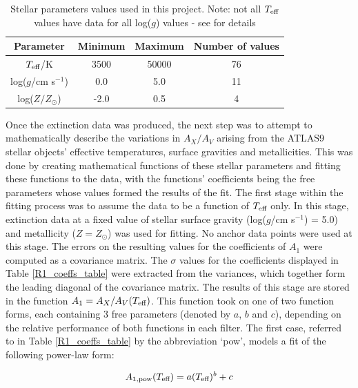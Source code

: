 \documentclass[12pt, a4paper]{report}
\begin{document}
\begin{table}
\begin{center}
\begin{tabular}{cccc}
\hline
Parameter & Minimum & Maximum & Number of values\\
\hline
$T_{\textnormal{eff}}$/K & 3500 & 50000 & 76 \\
log($g$/cm s$^{-1}$) & 0.0 & 5.0 & 11 \\
log($Z/Z_{\odot}$) & -2.0 & 0.5 & 4 \\
\hline

\end{tabular}
\caption{Stellar parameters values used in this project. Note: not all $T_{\textnormal{eff}}$ values have data for all log($g$) values - see \cite{2004astro.ph..5087C} for details}
\label{param_range_table}
\end{center}
\end{table}
Once the extinction data was produced, the next step was to attempt to mathematically describe the variations in $A_{X}/A_{V}$ arising from the ATLAS9 stellar objects' effective temperatures, surface gravities and metallicities. This was done by creating mathematical functions of these stellar parameters and fitting these functions to the data, with the functions' coefficients being the free parameters whose values formed the results of the fit.
The first stage within the fitting process was to assume the data to be a function of $T_{\textnormal{eff}}$ only. In this stage, extinction data at a fixed value of stellar surface gravity (log($g$/cm s$^{-1}$) = 5.0) and metallicity ($Z = Z_{\odot}$) was used for fitting. No anchor data points were used at this stage. The errors on the resulting values for the coefficients of $A_{1}$ were computed as a covariance matrix. The $\sigma$ values for the coefficients displayed in Table \ref{R1_coeffs_table} were extracted from the variances, which together form the leading diagonal of the covariance matrix. The results of this stage are stored in the function $A_{1} = A_{X}/A_{V}(T_{\textnormal{eff}})$. This function took on one of two function forms, each containing 3 free parameters (denoted by $a$, $b$ and $c$), depending on the relative performance of both functions in each filter. The first case, referred to in Table \ref{R1_coeffs_table} by the abbreviation `pow', models a fit of the following power-law form:

\begin{equation}
A_{1,\textnormal{pow}} (T_{\textnormal{eff}}) = a (T_{\textnormal{eff}})^{b} + c
\label{Teff_pow}
\end{equation}
\end{document}
